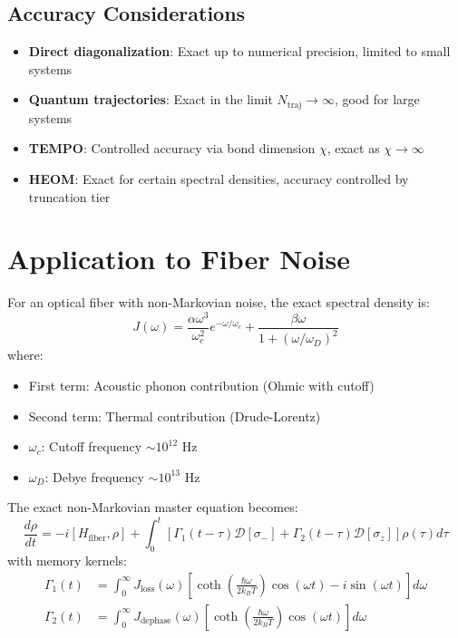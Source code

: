 \documentclass[12pt]{article}
\begin{document}
\subsection{Accuracy Considerations}

\begin{itemize}
\item \textbf{Direct diagonalization}: Exact up to numerical precision, limited to small systems
\item \textbf{Quantum trajectories}: Exact in the limit $N_{\text{traj}} \to \infty$, good for large systems
\item \textbf{TEMPO}: Controlled accuracy via bond dimension $\chi$, exact as $\chi \to \infty$
\item \textbf{HEOM}: Exact for certain spectral densities, accuracy controlled by truncation tier
\end{itemize}

\section{Application to Fiber Noise}

For an optical fiber with non-Markovian noise, the exact spectral density is:
\[
J(\omega) = \frac{\alpha \omega^3}{\omega_c^2} e^{-\omega/\omega_c} + \frac{\beta \omega}{1 + (\omega/\omega_D)^2}
\]
where:
\begin{itemize}
\item First term: Acoustic phonon contribution (Ohmic with cutoff)
\item Second term: Thermal contribution (Drude-Lorentz)
\item $\omega_c$: Cutoff frequency $\sim 10^{12}$ Hz
\item $\omega_D$: Debye frequency $\sim 10^{13}$ Hz
\end{itemize}

The exact non-Markovian master equation becomes:
\[
\frac{d\rho}{dt} = -i[H_{\text{fiber}}, \rho] + \int_0^t \left[ \Gamma_1(t-\tau)\mathcal{D}[\sigma_-] + \Gamma_2(t-\tau)\mathcal{D}[\sigma_z] \right] \rho(\tau) d\tau
\]
with memory kernels:
\begin{align}
\Gamma_1(t) &= \int_0^\infty J_{\text{loss}}(\omega) \left[ \coth\left(\frac{\hbar\omega}{2k_B T}\right) \cos(\omega t) - i \sin(\omega t) \right] d\omega \\
\Gamma_2(t) &= \int_0^\infty J_{\text{dephase}}(\omega) \left[ \coth\left(\frac{\hbar\omega}{2k_B T}\right) \cos(\omega t) \right] d\omega
\end{align}
\end{document}
